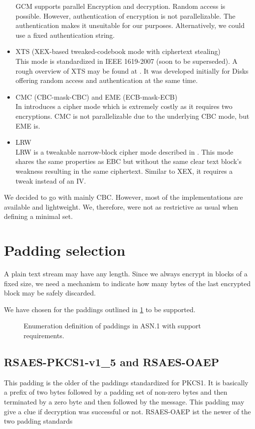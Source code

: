 \begin{itemize}
	GCM supports parallel Encryption and decryption. Random access is possible. However, authentication of encryption is not parallelizable. The authentication makes it unsuitable for our purposes. Alternatively, we could use a fixed authentication string.
	\item XTS (XEX-based tweaked-codebook mode with ciphertext stealing)\\
	This mode is standardized in IEEE 1619-2007 (soon to be superseded). A rough overview of XTS may be found at \cite{Martin2010}. It was developed initially for Disks offering random access and authentication at the same time. 
	\item CMC (CBC-mask-CBC) and EME (ECB-mask-ECB)\\ 
	In \cite{Halevi:2003} \citeauthor{Halevi:2003} introduces a cipher mode which is extremely costly as it requires two encryptions. CMC is not parallelizable due to the underlying CBC mode, but EME is. 
	\item LRW\\
	LRW is a tweakable narrow-block cipher mode described in \cite{tschorsch:translayeranon}. This mode shares the same properties as EBC but without the same clear text block's weakness resulting in the same ciphertext. Similar to XEX, it requires a tweak instead of an IV.
\end{itemize}

We decided to go with mainly CBC. However, most of the implementations are available and lightweight. We, therefore, were not as restrictive as usual when defining a minimal set.

\section{Padding selection}
A plain text stream may have any length. Since we always encrypt in blocks of a fixed size, we need a mechanism to indicate how many bytes of the last encrypted block may be safely discarded. 

We have chosen for the paddings outlined in \cref{fig:defPaddings} to be supported.
\begin{figure}[ht]
	
	\caption{Enumeration definition of paddings in ASN.1 with support requirements.}
	\label{fig:defPaddings}
\end{figure}

\subsection{RSAES-PKCS1-v1\_5 and RSAES-OAEP}
This padding is the older of the paddings standardized for PKCS1. It is basically a prefix of two bytes followed by a padding set of non-zero bytes and then terminated by a zero byte and then followed by the message. This padding may give a clue if decryption was successful or not. RSAES-OAEP ist the newer of the two padding standards 

